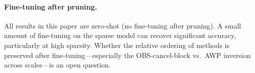 \documentclass{article}
\begin{document}
\paragraph{Fine-tuning after pruning.}
All results in this paper are zero-shot (no fine-tuning after pruning). A small
amount of fine-tuning on the sparse model can recover significant accuracy,
particularly at high sparsity. Whether the relative ordering of methods is
preserved after fine-tuning---especially the OBS-cancel-block vs.\ AWP
inversion across scales---is an open question.

\clearpage


\end{document}
